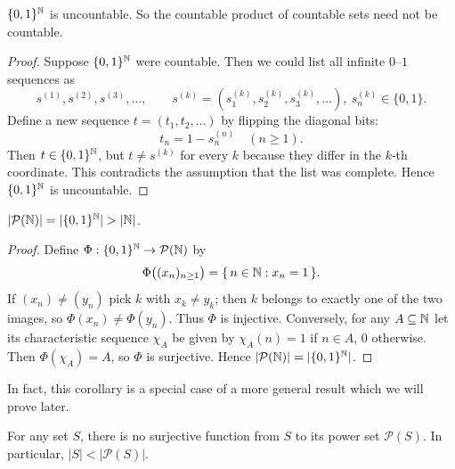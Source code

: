 \begin{theorem}
  $\{0,1\}^{\mathbb{N}}$ is uncountable. So the countable product of countable sets need not be countable.
\end{theorem}
\begin{proof}
  Suppose $\{0,1\}^{\mathbb{N}}$ were countable. Then we could list all infinite $0$–$1$ sequences as
  \[
  s^{(1)},s^{(2)},s^{(3)},\ldots,\qquad
  s^{(k)}=(s^{(k)}_1,s^{(k)}_2,s^{(k)}_3,\ldots),\ s^{(k)}_n\in\{0,1\}.
  \]
  Define a new sequence $t=(t_1,t_2,\ldots)$ by flipping the diagonal bits:
  \[
  t_n = 1 - s^{(n)}_n\quad (n\ge 1).
  \]
  Then $t\in\{0,1\}^{\mathbb{N}}$, but $t\neq s^{(k)}$ for every $k$ because they differ in the $k$‑th coordinate. This contradicts the assumption that the list was complete. Hence $\{0,1\}^{\mathbb{N}}$ is uncountable. 
\end{proof}

\newpage

\begin{corollary}
  $|\mathcal{P}(\N)|=|\{0,1\}^{\N}|>|\N|$.
\end{corollary}
\begin{proof}
  Define $\Phi:\{0,1\}^{\mathbb{N}}\to \mathcal{P}(\mathbb{N})$ by
  \[
  \Phi\bigl((x_n)_{n\ge1}\bigr)=\{\,n\in\mathbb{N}: x_n=1\,\}.
  \]
  If $(x_n)\neq(y_n)$ pick $k$ with $x_k\neq y_k$; then $k$ belongs to exactly one of the two images, so $\Phi(x_n)\neq\Phi(y_n)$. Thus $\Phi$ is injective. Conversely, for any $A\subseteq\mathbb{N}$ let its characteristic sequence $\chi_A$ be given by $\chi_A(n)=1$ if $n\in A$, $0$ otherwise. Then $\Phi(\chi_A)=A$, so $\Phi$ is surjective. Hence $|\mathcal{P}(\mathbb{N})|=|\{0,1\}^{\mathbb{N}}|$.
\end{proof}

In fact, this corollary is a special case of a more general result which we will prove later.

\begin{theorem}
For any set $S$, there is no surjective function from $S$ to its power set $\mathcal{P}(S)$. In particular, $|S| < |\mathcal{P}(S)|$.
\end{theorem}

